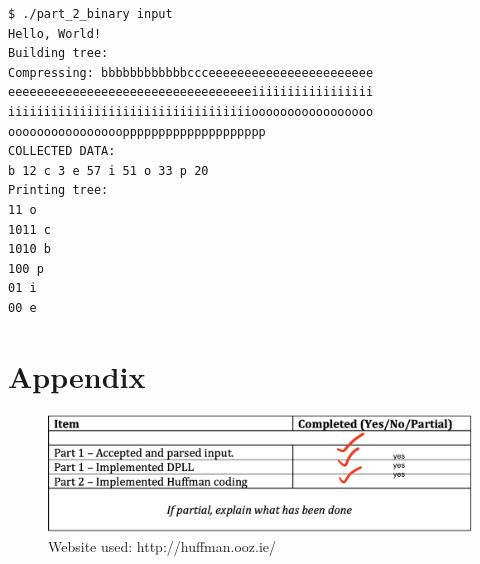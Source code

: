 \documentclass[a4paper, 12pt]{article}
\begin{document}
\begin{lstlisting}[caption=Program output]
$ ./part_2_binary input
Hello, World!
Building tree:
Compressing: bbbbbbbbbbbbccceeeeeeeeeeeeeeeeeeeeeee
eeeeeeeeeeeeeeeeeeeeeeeeeeeeeeeeeeiiiiiiiiiiiiiiiii
iiiiiiiiiiiiiiiiiiiiiiiiiiiiiiiiiiooooooooooooooooo
oooooooooooooooopppppppppppppppppppp
COLLECTED DATA:
b 12 c 3 e 57 i 51 o 33 p 20
Printing tree:
11 o
1011 c
1010 b
100 p
01 i
00 e
\end{lstlisting}

\section{Appendix}
\begin{figure}[h]
    \centering
    \includegraphics[width=1\textwidth]{completion}
    \caption{Website used: http://huffman.ooz.ie/}
\end{figure}
\end{document}
